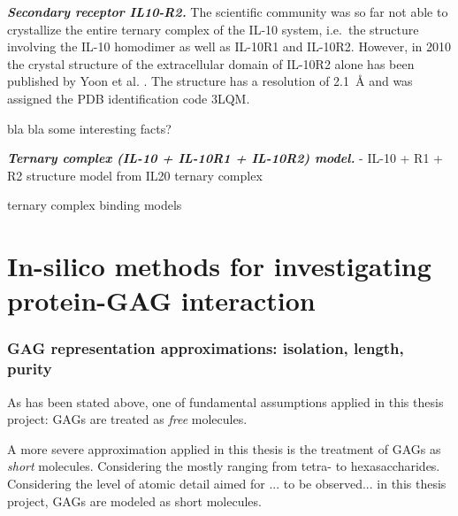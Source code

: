 \vspace{0.5cm}
\textit{\textbf{Secondary receptor IL10-R2.}}
The scientific community was so far not able to crystallize the entire ternary
complex of the IL-10 system, i.e.\ the structure involving the IL-10 homodimer
as well as IL-10R1 and IL-10R2. However, in 2010 the crystal structure of the
extracellular domain of IL-10R2 alone has been published by Yoon et al.
\cite{il10r2_structure_2010}. The structure has a resolution of
\SI{2.1}{\angstrom} and was assigned the PDB identification code 3LQM.


bla bla some interesting facts?

\vspace{0.5cm}
\textit{\textbf{Ternary complex (IL-10 + IL-10R1 + IL-10R2) model.}}
        - IL-10 + R1 + R2 structure model from IL20 ternary complex

            ternary complex binding models
\lipsum[1-2]


\section{In-silico methods for investigating protein-GAG interaction}


\subsubsection{GAG representation approximations: isolation, length, purity}

As has been stated above, one of fundamental assumptions applied in this thesis
project: GAGs are treated as \textit{free} molecules.


A more severe approximation applied in this thesis is the treatment of GAGs as
\textit{short} molecules. Considering the  mostly ranging from tetra- to hexasaccharides. Considering the level of atomic detail aimed for ... to be observed... in this
thesis project, GAGs are modeled as short molecules.


